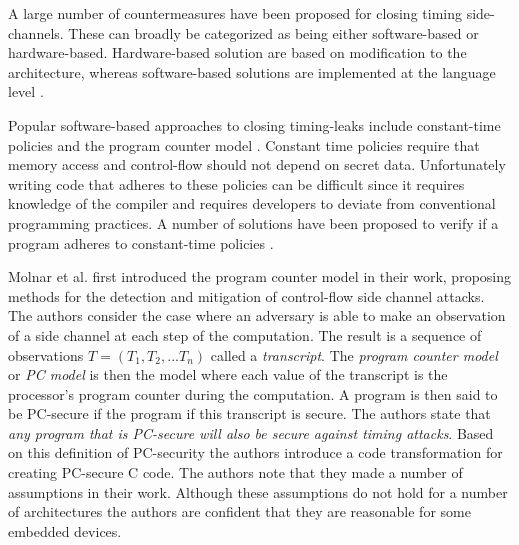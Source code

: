 A large number of countermeasures have been proposed for closing timing side-channels. These can broadly be categorized as being either software-based or hardware-based. 
Hardware-based solution are based on modification to the architecture, whereas software-based solutions are implemented at the language level \cite{Barthe}. 

Popular software-based approaches to closing timing-leaks include constant-time policies and the program counter model \cite{Barthe}. 
Constant time policies require that memory access and control-flow should not depend on secret data. 
Unfortunately writing code that adheres to these policies can be difficult since it requires knowledge of the compiler and requires developers to deviate from 
conventional programming practices.
A number of solutions have been proposed to verify if a program adheres to constant-time policies \cite{verify-constant-time, Barthe}.


Molnar et al. \cite{programcounter} first introduced the program counter model in their work, proposing methods for the detection and mitigation of control-flow side channel attacks. 
The authors consider the case where an adversary is able to make an observation of a side channel at each step of the computation. 
The result is a sequence of observations $T= (T_1, T_2, ... T_n)$ called a \textit{transcript}.
The \textit{program counter model} or \textit{PC model} is then the model where each value of the transcript is the processor's program counter during the computation. 
A program is then said to be  PC-secure if the program if this transcript is secure. 
The authors state that \textit{any program that is PC-secure will also be secure against timing attacks}.
Based on this definition of PC-security the authors introduce a code transformation for creating PC-secure C code.
The authors note that they made a number of assumptions in their work. Although these assumptions do not hold for a number of architectures the authors are confident 
that they are reasonable for some embedded devices. 	

%
%
%
%
 

